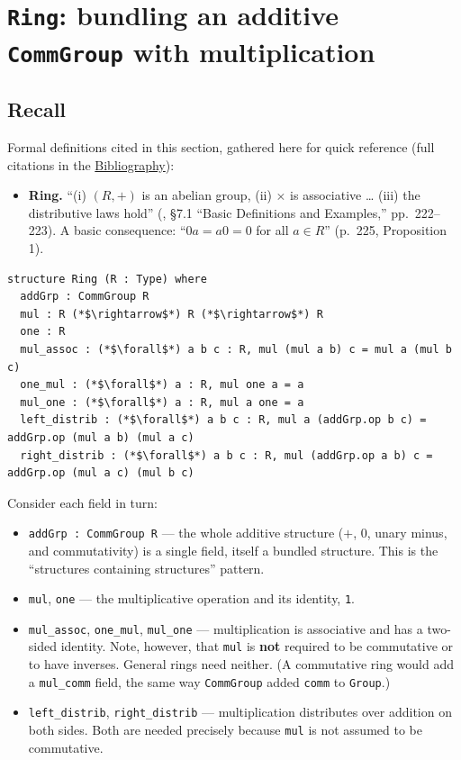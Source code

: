 \section{\texorpdfstring{\texttt{Ring}: bundling an additive \texttt{CommGroup} with multiplication}{Ring: bundling an additive CommGroup with multiplication}}\label{sec:08-rings:03-ring:1}

\subsection{Recall}\label{sec:08-rings:03-ring:2}

Formal definitions cited in this section, gathered here for quick reference (full citations in the \hyperref[sec:root:bibliography:1]{Bibliography}):

\begin{itemize}
\tightlist
\item
  \textbf{Ring.} ``(i) \((R, +)\) is an abelian group, (ii) \(\times\) is associative \ldots{} (iii) the distributive laws hold'' (\cite{DummitFoote2003}, §7.1 ``Basic Definitions and Examples,'' pp.~222--223). A basic consequence: ``\(0a = a0 = 0\) for all \(a \in R\)'' (p.~225, Proposition 1).
\end{itemize}

\begin{lstlisting}
structure Ring (R : Type) where
  addGrp : CommGroup R
  mul : R (*$\rightarrow$*) R (*$\rightarrow$*) R
  one : R
  mul_assoc : (*$\forall$*) a b c : R, mul (mul a b) c = mul a (mul b c)
  one_mul : (*$\forall$*) a : R, mul one a = a
  mul_one : (*$\forall$*) a : R, mul a one = a
  left_distrib : (*$\forall$*) a b c : R, mul a (addGrp.op b c) = addGrp.op (mul a b) (mul a c)
  right_distrib : (*$\forall$*) a b c : R, mul (addGrp.op a b) c = addGrp.op (mul a c) (mul b c)
\end{lstlisting}

Consider each field in turn:

\begin{itemize}
\tightlist
\item
  \texttt{addGrp : CommGroup R} --- the whole additive structure (\(+\), \(0\), unary minus, and commutativity) is a single field, itself a bundled structure. This is the ``structures containing structures'' pattern.
\item
  \texttt{mul}, \texttt{one} --- the multiplicative operation and its identity, \texttt{1}.
\item
  \texttt{mul\_\allowbreak{}assoc}, \texttt{one\_\allowbreak{}mul}, \texttt{mul\_\allowbreak{}one} --- multiplication is associative and has a two-sided identity. Note, however, that \texttt{mul} is \textbf{not} required to be commutative or to have inverses. General rings need neither. (A commutative ring would add a \texttt{mul\_\allowbreak{}comm} field, the same way \texttt{CommGroup} added \texttt{comm} to \texttt{Group}.)
\item
  \texttt{left\_\allowbreak{}distrib}, \texttt{right\_\allowbreak{}distrib} --- multiplication distributes over addition on both sides. Both are needed precisely because \texttt{mul} is not assumed to be commutative.
\end{itemize}

